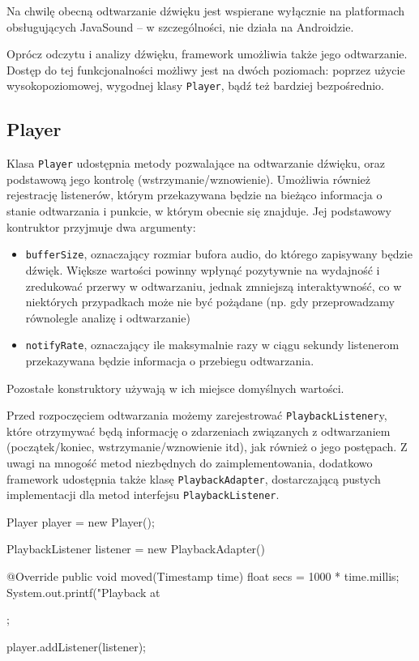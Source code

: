 \begin{Important}
Na chwilę obecną odtwarzanie dźwięku jest wspierane wyłącznie na platformach obsługujących JavaSound
-- w szczególności, nie działa na Androidzie.
\end{Important}

Oprócz odczytu i analizy dźwięku, framework umożliwia także jego odtwarzanie. Dostęp do tej
funkcjonalności możliwy jest na dwóch poziomach: poprzez użycie wysokopoziomowej, wygodnej klasy
\texttt{Player}, bądź też bardziej bezpośrednio.

\subsection{Player}

Klasa \texttt{Player} udostępnia metody pozwalające na odtwarzanie dźwięku, oraz podstawową jego
kontrolę (wstrzymanie/wznowienie). Umożliwia również rejestrację listenerów, którym przekazywana
będzie na bieżąco informacja o stanie odtwarzania i punkcie, w którym obecnie się znajduje. Jej
podstawowy kontruktor przyjmuje dwa argumenty:

\begin{itemize}
  \item \texttt{bufferSize}, oznaczający rozmiar bufora audio, do którego zapisywany będzie dźwięk.
    Większe wartości powinny wpłynąć pozytywnie na wydajność i zredukować przerwy w odtwarzaniu,
    jednak zmniejszą interaktywność, co w niektórych przypadkach może nie być pożądane (np. gdy
    przeprowadzamy równolegle analizę i odtwarzanie)

  \item \texttt{notifyRate}, oznaczający ile maksymalnie razy w ciągu sekundy listenerom
    przekazywana będzie informacja o przebiegu odtwarzania.

\end{itemize}

Pozostałe konstruktory używają w ich miejsce domyślnych wartości.

Przed rozpoczęciem odtwarzania możemy zarejestrować \texttt{PlaybackListener}y, które otrzymywać
będą informację o zdarzeniach związanych z odtwarzaniem (początek/koniec, wstrzymanie/wznowienie
itd), jak również o jego postępach. Z uwagi na mnogość metod niezbędnych do zaimplementowania,
dodatkowo framework udostępnia także klasę \texttt{PlaybackAdapter}, dostarczającą pustych
implementacji dla metod interfejsu \texttt{PlaybackListener}.

\begin{java}
Player player = new Player();

PlaybackListener listener = new PlaybackAdapter() {

    @Override
    public void moved(Timestamp time) {
        float secs = 1000 * time.millis;
        System.out.printf("Playback at %
    }
};

player.addListener(listener);
\end{java}

